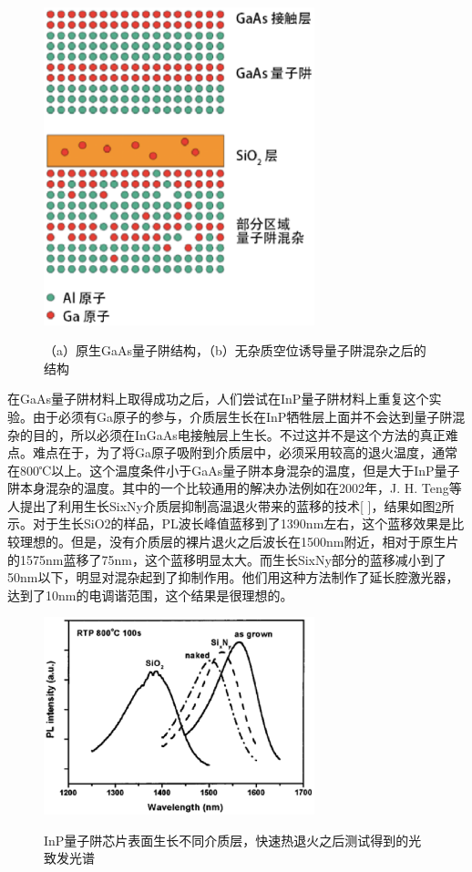 \documentclass{ZJUthesis}
\begin{document}
\begin{figure}[!ht]
  \centering
  \includegraphics[width=0.7\textwidth]{./Pictures/ifvd.eps}\\
  \caption{（a）原生GaAs量子阱结构，（b）无杂质空位诱导量子阱混杂之后的结构}
  \label{fig_ifvd}
\end{figure}

在GaAs量子阱材料上取得成功之后，人们尝试在InP量子阱材料上重复这个实验。由于必须有Ga原子的参与，介质层生长在InP牺牲层上面并不会达到量子阱混杂的目的，所以必须在InGaAs电接触层上生长。不过这并不是这个方法的真正难点。难点在于，为了将Ga原子吸附到介质层中，必须采用较高的退火温度，通常在800℃以上。这个温度条件小于GaAs量子阱本身混杂的温度，但是大于InP量子阱本身混杂的温度。其中的一个比较通用的解决办法例如在2002年，J. H. Teng等人提出了利用生长SixNy介质层抑制高温退火带来的蓝移的技术[ ]，结果如图\ref{fig_ifvd2}所示。对于生长SiO2的样品，PL波长峰值蓝移到了1390nm左右，这个蓝移效果是比较理想的。但是，没有介质层的裸片退火之后波长在1500nm附近，相对于原生片的1575nm蓝移了75nm，这个蓝移明显太大。而生长SixNy部分的蓝移减小到了50nm以下，明显对混杂起到了抑制作用。他们用这种方法制作了延长腔激光器，达到了10nm的电调谐范围，这个结果是很理想的。

\begin{figure}[!ht]
  \centering
  \includegraphics[width=0.7\textwidth]{./Pictures/ifvd2.eps}\\
  \caption{InP量子阱芯片表面生长不同介质层，快速热退火之后测试得到的光致发光谱}
  \label{fig_ifvd2}
\end{figure}
\end{document}
